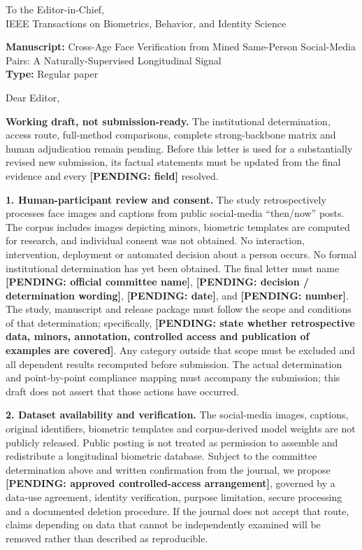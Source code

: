 \documentclass[11pt,a4paper]{article}
\newcommand{\pending}[1]{\textbf{[PENDING: #1]}}
\begin{document}
\noindent
To the Editor-in-Chief,\\
IEEE Transactions on Biometrics, Behavior, and Identity Science

\vspace{3mm}
\noindent
\textbf{Manuscript:} Cross-Age Face Verification from Mined Same-Person Social-Media Pairs:
A Naturally-Supervised Longitudinal Signal\\
\textbf{Type:} Regular paper

\vspace{4mm}
\noindent
Dear Editor,

\textbf{Working draft, not submission-ready.} The institutional determination, access route,
full-method comparisons, complete strong-backbone matrix and human adjudication remain pending.
Before this letter is used for a substantially revised new submission, its factual statements
must be updated from the final evidence and every \pending{field} resolved.

\vspace{3mm}
\noindent\textbf{1. Human-participant review and consent.}
The study retrospectively processes face images and captions from public social-media ``then/now''
posts. The corpus includes images depicting minors, biometric templates are computed for research,
and individual consent was not obtained. No interaction, intervention, deployment or automated
decision about a person occurs. No formal institutional determination has yet been obtained.
The final letter must name \pending{official committee name},
\pending{decision / determination wording}, \pending{date}, and \pending{number}. The study,
manuscript and release package must follow the scope and conditions of that determination; specifically,
\pending{state whether retrospective data, minors, annotation, controlled access and publication of
examples are covered}. Any category outside that scope must be excluded and all dependent results
recomputed before submission. The actual determination and point-by-point compliance mapping must
accompany the submission; this draft does not assert that those actions have occurred.

\vspace{3mm}
\noindent\textbf{2. Dataset availability and verification.}
The social-media images, captions, original identifiers, biometric templates and corpus-derived model
weights are not publicly released. Public posting is not treated as permission to assemble and
redistribute a longitudinal biometric database. Subject to the committee determination above and
written confirmation from the journal, we propose \pending{approved controlled-access arrangement},
governed by a data-use agreement, identity verification, purpose limitation, secure processing and a
documented deletion procedure. If the journal does not accept that route, claims depending on data
that cannot be independently examined will be removed rather than described as reproducible.
\end{document}
